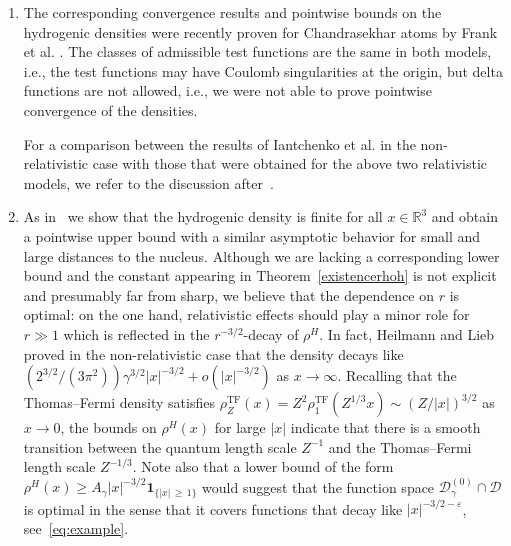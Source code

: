 \documentclass[AHL,Unicode,longabstracts,published]{cedram}
\newcommand{\TF}{\mathrm{TF}}
\newcommand*\rz{\mathbb{R}}
\newcommand{\one}{\mathbf{1}}
\newcommand*\cD{\mathcal{D}}
\begin{document}
\begin{enumerate}
\item The corresponding convergence results and pointwise bounds on the hydrogenic densities were recently proven for Chandrasekhar atoms by Frank et al. \cite{Franketal2020P}. The classes of admissible test functions are the same in both models, i.e., the test functions may have Coulomb singularities at the origin, but delta functions are not allowed, i.e., we were not able to prove pointwise convergence of the densities.

For a comparison between the results of Iantchenko et al. \cite{Iantchenkoetal1996} in the non-relativistic case with those that were obtained for the above two relativistic models, we refer to the discussion after~\cite[Theorem~1.2]{Franketal2020P}.


\item As in~\cite{Franketal2020P} we show that the hydrogenic density is finite for all $x\in\rz^3$ and obtain a pointwise upper bound with a similar asymptotic behavior for small and large distances to the nucleus. Although we are lacking a corresponding lower bound and the constant appearing in Theorem~\ref{existencerhoh} is not explicit and presumably far from sharp, we believe that the dependence on $r$ is optimal: on the one hand, relativistic effects should play a minor role for $r\gg1$ which is reflected in the $r^{-3/2}$-decay of $\rho^H$. In fact, Heilmann and Lieb~\cite{HeilmannLieb1995} proved in the non-relativistic case that the density decays like $(2^{3/2}/(3\pi^2))\gamma^{3/2}|x|^{-3/2}+o(|x|^{-3/2})$ as $x\to\infty$. Recalling that the Thomas--Fermi density satisfies $\rho_Z^{\TF}(x)=Z^2\rho_1^{\TF}(Z^{1/3}x)\sim(Z/|x|)^{3/2}$ as $x\to0$, the bounds on $\rho^H(x)$ for large $|x|$ indicate that there is a smooth transition between the quantum length scale $Z^{-1}$ and the Thomas--Fermi length scale $Z^{-1/3}$. Note also that a lower bound of the form $\rho^H(x)\geq A_\gamma |x|^{-3/2}\one_{\{|x|\,\geq\,1\}}$ would suggest that the function space $\cD_\gamma^{(0)}\cap\cD$ is optimal in the sense that it covers functions that decay like $|x|^{-3/2-\varepsilon}$, see~\eqref{eq:example}.


\end{enumerate}
\end{document}
